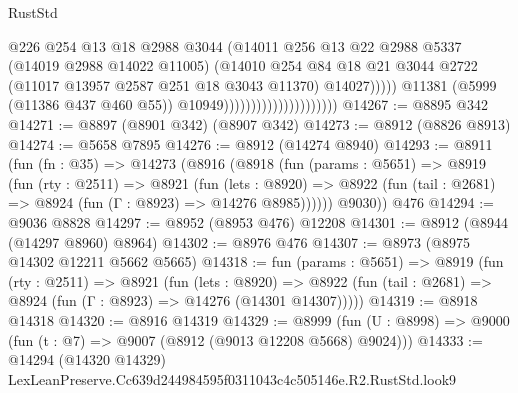 \begin{lexlean}{RustStd}
\begin{coremodule}
                                                    @226
                                                    @254
                                                    @13
                                                    @18
                                                    @2988
                                                    @3044
                                                    (@14011
                                                      @256
                                                      @13
                                                      @22
                                                      @2988
                                                      @5337
                                                      (@14019 @2988 @14022 @11005)
                                                      (@14010
                                                        @254
                                                        @84
                                                        @18
                                                        @21
                                                        @3044
                                                        @2722
                                                        (@11017 @13957 @2587 @251 @18 @3043 @11370)
                                                        @14027)))))
                                              @11381
                                              (@5999 (@11386 @437 @460 @55))
                                              @10949)))))))))))))))))))))
@14267 := @8895 @342
@14271 := @8897 (@8901 @342) (@8907 @342)
@14273 := @8912 (@8826 @8913)
@14274 := @5658 @7895
@14276 := @8912 (@14274 @8940)
@14293 := @8911
    (fun (fn : @35) =>
    @14273
      (@8916
        (@8918
          (fun (params : @5651) =>
          @8919
            (fun (rty : @2511) =>
            @8921
              (fun (lets : @8920) =>
              @8922 (fun (tail : @2681) => @8924 (fun (Γ : @8923) => @14276 @8985))))))
        @9030))
    @476
@14294 := @9036 @8828
@14297 := @8952 (@8953 @476) @12208
@14301 := @8912 (@8944 (@14297 @8960) @8964)
@14302 := @8976 @476
@14307 := @8973 (@8975 @14302 @12211 @5662 @5665)
@14318 := fun (params : @5651) =>
  @8919
    (fun (rty : @2511) =>
    @8921
      (fun (lets : @8920) =>
      @8922 (fun (tail : @2681) => @8924 (fun (Γ : @8923) => @14276 (@14301 @14307)))))
@14319 := @8918 @14318
@14320 := @8916 @14319
@14329 := @8999
    (fun (U : @8998) => @9000 (fun (t : @7) => @9007 (@8912 (@9013 @12208 @5668) @9024)))
@14333 := @14294 (@14320 @14329) LexLeanPreserve.Cc639d244984595f0311043c4c505146e.R2.RustStd.look9

\end{coremodule}
\end{lexlean}
